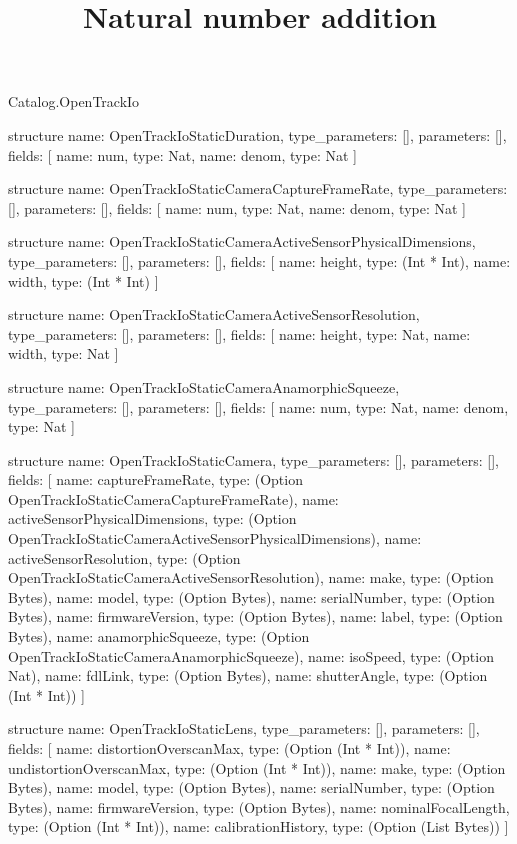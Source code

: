 \begin{lexlean}{Catalog.OpenTrackIo}
\title{Natural number addition}
\begin{semanticmodule}
structure{
  name: OpenTrackIoStaticDuration,
  type_parameters: [],
  parameters: [],
  fields: [
    {name: num, type: Nat},
    {name: denom, type: Nat}
  ]
}

structure{
  name: OpenTrackIoStaticCameraCaptureFrameRate,
  type_parameters: [],
  parameters: [],
  fields: [
    {name: num, type: Nat},
    {name: denom, type: Nat}
  ]
}

structure{
  name: OpenTrackIoStaticCameraActiveSensorPhysicalDimensions,
  type_parameters: [],
  parameters: [],
  fields: [
    {name: height, type: (Int * Int)},
    {name: width, type: (Int * Int)}
  ]
}

structure{
  name: OpenTrackIoStaticCameraActiveSensorResolution,
  type_parameters: [],
  parameters: [],
  fields: [
    {name: height, type: Nat},
    {name: width, type: Nat}
  ]
}

structure{
  name: OpenTrackIoStaticCameraAnamorphicSqueeze,
  type_parameters: [],
  parameters: [],
  fields: [
    {name: num, type: Nat},
    {name: denom, type: Nat}
  ]
}

structure{
  name: OpenTrackIoStaticCamera,
  type_parameters: [],
  parameters: [],
  fields: [
    {name: captureFrameRate, type: (Option OpenTrackIoStaticCameraCaptureFrameRate)},
    {name: activeSensorPhysicalDimensions, type: (Option OpenTrackIoStaticCameraActiveSensorPhysicalDimensions)},
    {name: activeSensorResolution, type: (Option OpenTrackIoStaticCameraActiveSensorResolution)},
    {name: make, type: (Option Bytes)},
    {name: model, type: (Option Bytes)},
    {name: serialNumber, type: (Option Bytes)},
    {name: firmwareVersion, type: (Option Bytes)},
    {name: label, type: (Option Bytes)},
    {name: anamorphicSqueeze, type: (Option OpenTrackIoStaticCameraAnamorphicSqueeze)},
    {name: isoSpeed, type: (Option Nat)},
    {name: fdlLink, type: (Option Bytes)},
    {name: shutterAngle, type: (Option (Int * Int))}
  ]
}

structure{
  name: OpenTrackIoStaticLens,
  type_parameters: [],
  parameters: [],
  fields: [
    {name: distortionOverscanMax, type: (Option (Int * Int))},
    {name: undistortionOverscanMax, type: (Option (Int * Int))},
    {name: make, type: (Option Bytes)},
    {name: model, type: (Option Bytes)},
    {name: serialNumber, type: (Option Bytes)},
    {name: firmwareVersion, type: (Option Bytes)},
    {name: nominalFocalLength, type: (Option (Int * Int))},
    {name: calibrationHistory, type: (Option (List Bytes))}
  ]
}


\end{semanticmodule}
\end{lexlean}
